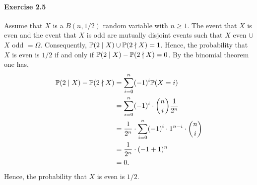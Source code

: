 \paragraph{Exercise 2.5} Assume that $X$ is a $B(n, 1/2)$ random variable with
$n \geq 1$. The event that $X$ is even and the event that $X$ is odd are mutually
disjoint events such that {$X$ even} $\cup$ {$X$ odd} $= \Omega$. Consequently,
$\mathbb{P}(2 \mid X) \cup \mathbb{P}(2 \nmid X) = 1$. Hence, the probability that $X$ is even
is $1/2$ if and only if $\mathbb{P}(2 \mid X) - \mathbb{P}(2 \nmid X) = 0$.
By the binomial theorem one has,
\begin{align*}
  \mathbb{P}(2 \mid X) - \mathbb{P}(2 \nmid X)
    &= \sum_{i=0}^{n} (-1)^i \mathbb{P}(X = i) \\
    &= \sum_{i=0}^{n} (-1)^i \cdot \binom{n}{i} \frac{1}{2^n} \\
    &= \frac{1}{2^n} \cdot \sum_{i=0}^{n} (-1)^i \cdot 1^{n-i} \cdot \binom{n}{i} \\
    &= \frac{1}{2^n} \cdot (-1 + 1)^n \\
    &= 0.
\end{align*}
Hence, the probability that $X$ is even is $1/2$.
